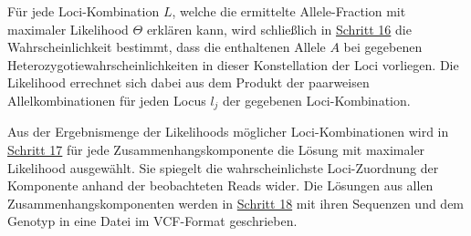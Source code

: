 Für jede Loci-Kombination $L$, welche die ermittelte Allele-Fraction mit maximaler Likelihood $\Theta$ erklären kann, wird schließlich in \hyperref[step16]{Schritt 16\label{step16txt}} die Wahrscheinlichkeit bestimmt, dass die enthaltenen Allele $A$ bei gegebenen Heterozygotiewahrscheinlichkeiten in dieser Konstellation der Loci vorliegen. Die Likelihood errechnet sich dabei aus dem Produkt der paarweisen Allelkombinationen für jeden Locus $l_{j}$ der gegebenen Loci-Kombination. 
\vspace{-0.5cm}
\begin{center}
\end{center}
Aus der Ergebnismenge der Likelihoods möglicher Loci-Kombinationen wird in \hyperref[step17]{Schritt 17\label{step17txt}} für jede Zusammenhangskomponente die Lösung mit maximaler Likelihood ausgewählt. Sie spiegelt die wahrscheinlichste Loci-Zuordnung der Komponente anhand der beobachteten Reads wider. Die Lösungen aus allen Zusammenhangskomponenten werden in \hyperref[step18]{Schritt 18\label{step18txt}} mit ihren Sequenzen und dem Genotyp in eine Datei im VCF-Format geschrieben.
\let\cleardoublepage\clearpage
